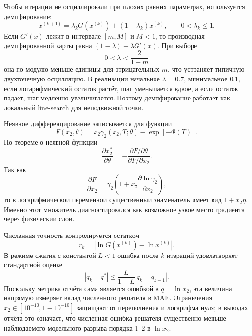 \documentclass[11pt]{article}
\theoremstyle{definition}
\begin{document}
Чтобы итерации не осциллировали при плохих ранних параметрах, используется демпфирование:
\begin{equation*}
    x^{(k+1)}
    =\lambda_k G(x^{(k)})+(1-\lambda_k)x^{(k)},
    \qquad 0<\lambda_k\leq 1.
\end{equation*}
Если $G'(x)$ лежит в интервале $[m,M]$ и $M<1$, то производная демпфированной карты равна
$(1-\lambda)+\lambda G'(x)$. При выборе
\begin{equation*}
    0<\lambda<\frac{2}{1-m}
\end{equation*}
она по модулю меньше единицы для отрицательных $m$, что устраняет типичную двухточечную осцилляцию. В реализации начальное $\lambda=0.7$, минимальное $0.1$; если логарифмический остаток растёт, шаг уменьшается вдвое, а если остаток падает, шаг медленно увеличивается. Поэтому демпфирование работает как локальный line-search для неподвижной точки.

Неявное дифференцирование записывается для функции~\cite{gould2021}
\begin{equation*}
    F(x_2,\theta)=x_2\gamma_2(x_2,T;\theta)-\exp[-\Phi(T)] .
\end{equation*}
По теореме о неявной функции
\begin{equation*}
    \frac{\partial x_2^*}{\partial\theta}
    =-
    \frac{\partial F/\partial\theta}{\partial F/\partial x_2}.
\end{equation*}
Так как
\begin{equation*}
    \frac{\partial F}{\partial x_2}
    =\gamma_2\left(1+x_2\frac{\partial\ln\gamma_2}{\partial x_2}\right),
\end{equation*}
то в логарифмической переменной существенный знаменатель имеет вид
$1+x_2\eta$. Именно этот множитель диагностировался как возможное узкое место градиента через физический слой.

Численная точность контролируется остатком
\begin{equation*}
    r_k=|\ln G(x^{(k)})-\ln x^{(k)}|.
\end{equation*}
В режиме сжатия с константой $L<1$ ошибка после $k$ итераций удовлетворяет стандартной оценке
\begin{equation*}
    |q_k-q^*|\leq \frac{L}{1-L}|q_k-q_{k-1}|.
\end{equation*}
Поскольку метрика отчёта сама является ошибкой в $q=\ln x_2$, эта величина напрямую измеряет вклад численного решателя в MAE. Ограничения $x_2\in[10^{-10},1-10^{-10}]$ защищают от переполнения и логарифма нуля; в выводах отчёта это означает, что численная ошибка решателя существенно меньше наблюдаемого модельного разрыва порядка $1$--$2$ в $\ln x_2$.
\end{document}
